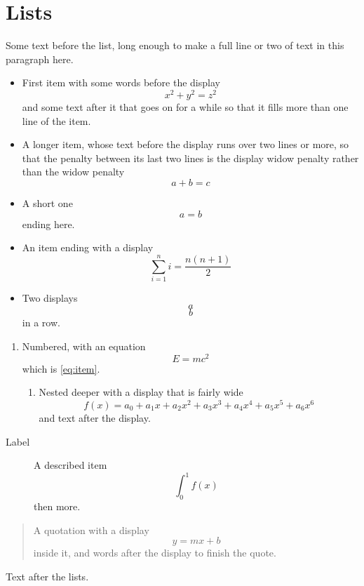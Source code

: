 \documentclass{article}
\begin{document}
\section{Lists}
Some text before the list, long enough to make a full line or two of text in this paragraph here.
\begin{itemize}
\item First item with some words before the display
\[ x^2 + y^2 = z^2 \]
and some text after it that goes on for a while so that it fills more than one line of the item.
\item A longer item, whose text before the display runs over two lines or more, so that the penalty between its last two lines is the display widow penalty rather than the widow penalty
\[ a + b = c \]
\item A short one $$ a = b $$ ending here.
\item An item ending with a display
\[ \sum_{i=1}^n i = \frac{n(n+1)}{2} \]
\item Two displays \[ a \] \[ b \] in a row.
\end{itemize}
\begin{enumerate}
\item Numbered, with an equation
\begin{equation}\label{eq:item}
E = mc^2
\end{equation}
which is \ref{eq:item}.
\begin{enumerate}
\item Nested deeper with a display that is fairly wide
\[ f(x) = a_0 + a_1 x + a_2 x^2 + a_3 x^3 + a_4 x^4 + a_5 x^5 + a_6 x^6 \]
and text after the display.
\end{enumerate}
\end{enumerate}
\begin{description}
\item[Label] A described item \[ \int_0^1 f(x) \] then more.
\end{description}
\begin{quote}
A quotation with a display \[ y = mx + b \] inside it, and words after the display to finish the quote.
\end{quote}
Text after the lists.
\end{document}
